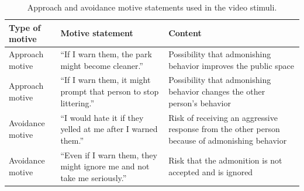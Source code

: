 \documentclass[utf8]{FrontiersinHarvard}
\begin{document}
\begin{table}[htbp]
\centering
\small
\caption{Approach and avoidance motive statements used in the video stimuli.}
\label{tab:motives}
\begin{tabularx}{\linewidth}{>{\hsize}Y >{\hsize}Y >{\hsize}Y}
\toprule
\textbf{Type of motive} & \textbf{Motive statement} & \textbf{Content} \\
\midrule
Approach motive & ``If I warn them, the park might become cleaner.'' & Possibility that admonishing behavior improves the public space \\
\midrule
Approach motive & ``If I warn them, it might prompt that person to stop littering.'' & Possibility that admonishing behavior changes the other person's behavior \\
\midrule
Avoidance motive & ``I would hate it if they yelled at me after I warned them.'' & Risk of receiving an aggressive response from the other person because of admonishing behavior \\
\midrule
Avoidance motive & ``Even if I warn them, they might ignore me and not take me seriously.'' & Risk that the admonition is not accepted and is ignored \\
\bottomrule
\end{tabularx}
\end{table}

\vspace{1em}
\end{document}
